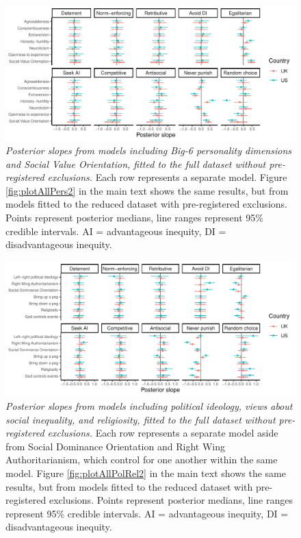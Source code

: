\documentclass[
  english,
  man, donotrepeattitle,floatsintext]{apa6}
\begin{document}
\begin{figure}
\centering
\includegraphics{manuscript_files/figure-latex/plotAllPers1-1.pdf}
\caption{\label{fig:plotAllPers1}\emph{Posterior slopes from models including Big-6
personality dimensions and Social Value Orientation, fitted to the full dataset
without pre-registered exclusions.} Each row represents a separate model. Figure
\ref{fig:plotAllPers2} in the main text shows the same results, but from models
fitted to the reduced dataset with pre-registered exclusions. Points represent
posterior medians, line ranges represent 95\% credible intervals. AI =
advantageous inequity, DI = disadvantageous inequity.}
\end{figure}

\newpage











\begin{figure}
\centering
\includegraphics{manuscript_files/figure-latex/plotAllPolRel1-1.pdf}
\caption{\label{fig:plotAllPolRel1}\emph{Posterior slopes from models including political
ideology, views about social inequality, and religiosity, fitted to the full
dataset without pre-registered exclusions.} Each row represents a separate model
aside from Social Dominance Orientation and Right Wing Authoritarianism, which
control for one another within the same model. Figure \ref{fig:plotAllPolRel2}
in the main text shows the same results, but from models fitted to the reduced
dataset with pre-registered exclusions. Points represent posterior medians, line
ranges represent 95\% credible intervals. AI = advantageous inequity, DI =
disadvantageous inequity.}
\end{figure}
\end{document}
